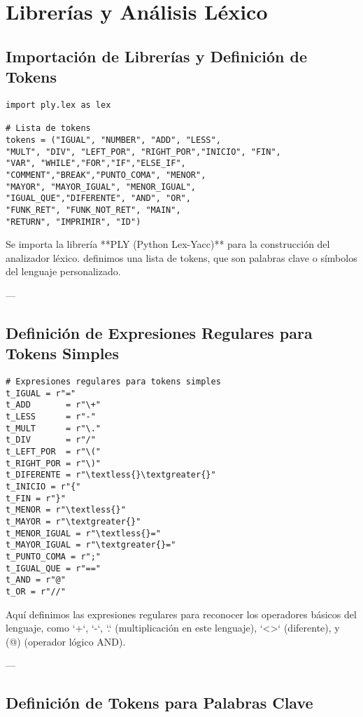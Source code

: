 \documentclass{article}
\begin{document}
\section{Librerías y Análisis Léxico}

\subsection{Importación de Librerías y Definición de Tokens}

\begin{verbatim}
import ply.lex as lex

# Lista de tokens
tokens = ("IGUAL", "NUMBER", "ADD", "LESS", 
"MULT", "DIV", "LEFT_POR", "RIGHT_POR","INICIO", "FIN", 
"VAR", "WHILE","FOR","IF","ELSE_IF", 
"COMMENT","BREAK","PUNTO_COMA", "MENOR",
"MAYOR", "MAYOR_IGUAL", "MENOR_IGUAL",
"IGUAL_QUE","DIFERENTE", "AND", "OR", 
"FUNK_RET", "FUNK_NOT_RET", "MAIN", 
"RETURN", "IMPRIMIR", "ID")
\end{verbatim}

Se importa la librería **PLY (Python Lex-Yacc)** para la construcción del analizador léxico.  definimos  una lista de tokens, que son palabras clave o símbolos del lenguaje personalizado.

---

\subsection{Definición de Expresiones Regulares para Tokens Simples}

\begin{verbatim}
# Expresiones regulares para tokens simples
t_IGUAL = r"="
t_ADD       = r"\+"
t_LESS      = r"-"
t_MULT      = r"\."
t_DIV       = r"/"
t_LEFT_POR  = r"\("
t_RIGHT_POR = r"\)"
t_DIFERENTE = r"\textless{}\textgreater{}"
t_INICIO = r"{"
t_FIN = r"}"
t_MENOR = r"\textless{}"
t_MAYOR = r"\textgreater{}"
t_MENOR_IGUAL = r"\textless{}="
t_MAYOR_IGUAL = r"\textgreater{}="
t_PUNTO_COMA = r";"
t_IGUAL_QUE = r"=="
t_AND = r"@"
t_OR = r"//"
\end{verbatim}

Aquí  definimos las expresiones regulares para reconocer los operadores básicos del lenguaje, como `+`, `-`, `.` (multiplicación en este lenguaje), `\textless{}\textgreater{}` (diferente), y (@) (operador lógico AND).

---

\subsection{Definición de Tokens para Palabras Clave}
\end{document}
